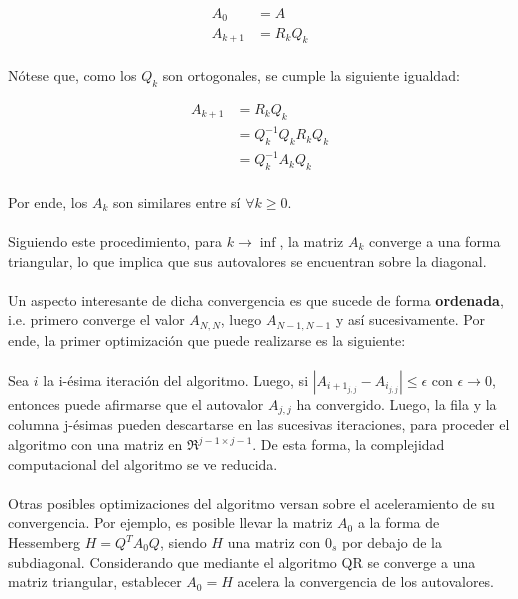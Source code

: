 \documentclass[12pt, twocolumn]{article}
\begin{document}
	\begin{align}
		A_{0} &= A \\
		A_{k+1} &= R_{k}Q_{k}
	\end{align}
	
	\paragraph{} Nótese que, como los $Q_{k}$ son ortogonales, se cumple la siguiente igualdad:
	
	\begin{align}
		A_{k+1} &= R_{k}Q_{k}  \\ &= Q^{-1}_{k}Q_{k}R_{k}Q_{k} \\ &= Q^{-1}_{k}A_{k}Q_{k}
	\end{align}
	
	\paragraph{} Por ende, los $A_{k}$ son similares entre sí $\forall k\ge0$.
	
	\paragraph{} Siguiendo este procedimiento, para $k\to\inf$, la matriz $A_{k}$ converge a una forma triangular, lo que implica que sus autovalores se encuentran sobre la diagonal.
	
	\paragraph{} Un aspecto interesante de dicha convergencia es que sucede de forma \textbf{ordenada}, i.e. primero converge el valor $A_{N,N}$, luego $A_{N-1,N-1}$ y así sucesivamente. Por ende, la primer optimización que puede realizarse es la siguiente: 
	
	\paragraph{} Sea $i$ la i-ésima iteración del algoritmo. Luego, si $|A_{i+1_{j,j}} -A_{i_{j,j}}| \le \epsilon$ con $\epsilon \to 0$, entonces puede afirmarse que el autovalor $A_{j,j}$ ha convergido. Luego, la fila y la columna j-ésimas pueden descartarse en las sucesivas iteraciones, para proceder el algoritmo con una matriz en $\Re^{j-1 \times j-1}$. De esta forma, la complejidad computacional del algoritmo se ve reducida.
	
	\paragraph{} Otras posibles optimizaciones del algoritmo versan sobre el aceleramiento de su convergencia. Por ejemplo, es posible llevar la matriz $A_{0}$ a la forma de Hessemberg $H = Q^{T}A_{0}Q$, siendo $H$ una matriz con $0_{s}$ por debajo de la subdiagonal. Considerando que mediante el algoritmo QR se converge a una matriz triangular, establecer $A_{0} = H$ acelera la convergencia de los autovalores.
	
\end{document}
